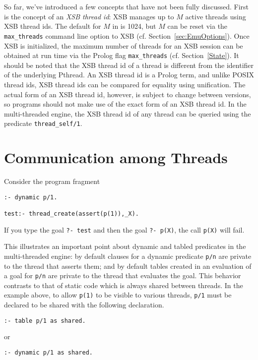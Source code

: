 So far, we've introduced a few concepts that have not been fully
discussed.  First is the concept of an {\em XSB thread id}: XSB
manages up to $M$ active threads using XSB thread ids.  The default
for $M$ in \version{} is 1024, but $M$ can be reset via the {\tt
  max\_threads} command line option to XSB
(cf. Section~\ref{sec:EmuOptions}).  Once XSB is initialized, the
maximum number of threads for an XSB session can be obtained at run
time via the Prolog flag {\tt max\_threads} (cf. Section~\ref{State}).
It should be noted that the XSB thread id of a thread is different
from the identifier of the underlying Pthread.  An XSB thread id is a
Prolog term, and unlike POSIX thread ids, XSB thread ids can be
compared for equality using unification.  The actual form of an XSB
thread id, however, is subject to change between versions, so programs
should not make use of the exact form of an XSB thread id.  In the
multi-threaded engine, the XSB thread id of any thread can be queried
using the predicate {\tt thread\_self/1}.

\section{Communication among Threads} \label{sec:shared}

\begin{example}
Consider the program fragment
%
\begin{verbatim}
:- dynamic p/1.

test:- thread_create(assert(p(1)),_X).
\end{verbatim}
If you type the goal {\tt ?- test} and then the goal {\tt ?- p(X)},
the call {\tt p(X)} will fail.  
\end{example}

\noindent
This illustrates an important point about dynamic and tabled
predicates in the multi-threaded engine: by default clauses for a
dynamic predicate {\tt p/n} are private to the thread that asserts
them; and by default tables created in an evaluation of a goal for
{\tt p/n} are private to the thread that evaluates the goal.  This
behavior contrasts to that of static code which is always shared
between threads.  In the example above, to allow {\tt p(1)} to be
visible to various threads, {\tt p/1} must be declared to be shared
with the following declaration.
%
\begin{verbatim}
:- table p/1 as shared.
\end{verbatim}
or
\begin{verbatim}
:- dynamic p/1 as shared.
\end{verbatim}

